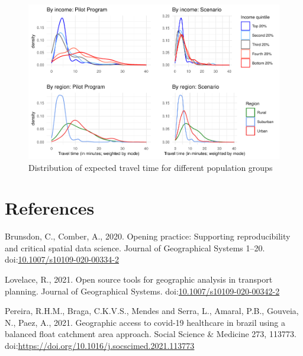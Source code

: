 \documentclass[]{elsarticle} %
\begin{document}
\begin{figure}

{\centering \includegraphics{Accessibility-Vaccination-Sites-Hamilton_files/figure-latex/figure-results-1} 

}

\caption{\label{fig:results}Distribution of expected travel time for different population groups}\label{fig:figure-results}
\end{figure}

\hypertarget{references}{%
\section*{References}\label{references}}

\hypertarget{refs}{}
\leavevmode\hypertarget{ref-Brunsdon2020opening}{}%
Brunsdon, C., Comber, A., 2020. Opening practice: Supporting
reproducibility and critical spatial data science. Journal of
Geographical Systems 1--20.
doi:\href{https://doi.org/10.1007/s10109-020-00334-2}{10.1007/s10109-020-00334-2}

\leavevmode\hypertarget{ref-Lovelace2021open}{}%
Lovelace, R., 2021. Open source tools for geographic analysis in
transport planning. Journal of Geographical Systems.
doi:\href{https://doi.org/10.1007/s10109-020-00342-2}{10.1007/s10109-020-00342-2}

\leavevmode\hypertarget{ref-Pereira2021geographic}{}%
Pereira, R.H.M., Braga, C.K.V.S., Mendes and Serra, L., Amaral, P.B.,
Gouveia, N., Paez, A., 2021. Geographic access to covid-19 healthcare in
brazil using a balanced float catchment area approach. Social Science \&
Medicine 273, 113773.
doi:\href{https://doi.org/https://doi.org/10.1016/j.socscimed.2021.113773}{https://doi.org/10.1016/j.socscimed.2021.113773}
\end{document}

